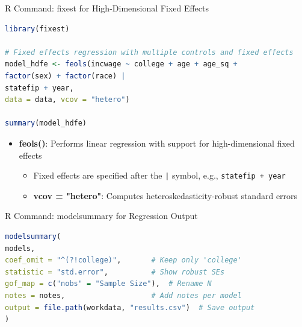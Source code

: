 \documentclass[dvipsnames,hyperref={pdfpagelabels=false}]{beamer}
\begin{document}
\begin{frame}[fragile]{R Command: fixest for High-Dimensional Fixed Effects}{}

\begin{lstlisting}[language=R]
library(fixest)

# Fixed effects regression with multiple controls and fixed effects
model_hdfe <- feols(incwage ~ college + age + age_sq + 
factor(sex) + factor(race) | 
statefip + year, 
data = data, vcov = "hetero")

summary(model_hdfe)
\end{lstlisting}
	\begin{itemize}
		\item \textbf{feols()}: Performs linear regression with support for high-dimensional fixed effects
		\vspace{0.2cm}
			\begin{itemize}
		\item Fixed effects are specified after the \texttt{|} symbol, e.g., \texttt{statefip + year}
		\vspace{0.2cm}
		\item \textbf{vcov = "hetero"}: Computes heteroskedasticity-robust standard errors
			\end{itemize}
	\end{itemize}
\end{frame}



\begin{frame}[fragile]{R Command: modelsummary for Regression Output}
	
	\vspace{0.3cm}
\begin{lstlisting}[language=R]
modelsummary(
models,
coef_omit = "^(?!college)",       # Keep only 'college'
statistic = "std.error",          # Show robust SEs
gof_map = c("nobs" = "Sample Size"),  # Rename N
notes = notes,                    # Add notes per model
output = file.path(workdata, "results.csv")  # Save output
)
\end{lstlisting}
	

\end{frame}
\end{document}
